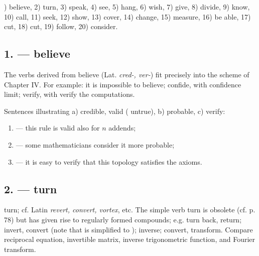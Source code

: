 )  believe, 2)  turn, 3)  speak, 4)  see, 5)  hang, 6)  wish, 7)  give, 8)  divide, 9)  know, 10)  call, 11)  seek, 12)  show, 13)  cover, 14)  change, 15)  measure, 16)  be able, 17)  cut, 18)  cut, 19)  follow, 20)  consider.

\subsection*{1.  --- believe}

The verbs derived from  believe (Lat. \emph{cred-, ver-}) fit precisely into the scheme of Chapter IV. For example:  it is impossible to believe;  confide, with  confidence limit;  verify, with  verify the computations.

Sentences illustrating a)  credible, valid ( untrue), b)  probable, c)  verify:

\begin{enumerate}[label=\alph*)]
\item {} --- this rule is valid also for $n$ addends;
\item {} --- some mathematicians consider it more probable;
\item {} --- it is easy to verify that this topology satisfies the axioms.
\end{enumerate}

\subsection*{2.  --- turn}

 turn; cf. Latin \emph{revert, convert, vortex}, etc. The simple verb  turn is obsolete (cf. p. 78) but has given rise to regularly formed compounds; e.g.  turn back, return; invert, convert (note that  is simplified to );  inverse;  convert, transform. Compare  reciprocal equation,  invertible matrix,  inverse trigonometric function, and  Fourier transform.

